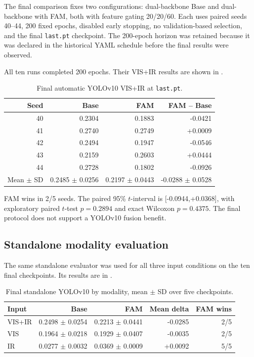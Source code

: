 The final comparison fixes two configurations: dual-backbone Base and
dual-backbone with FAM, both with feature gating 20/20/60. Each uses paired
seeds 40--44, 200 fixed epochs, disabled early stopping, no validation-based selection,
and the final \texttt{last.pt} checkpoint. The 200-epoch horizon was retained
because it was declared in the historical YAML schedule before the final results were observed.

All ten runs completed 200 epochs. Their VIS+IR results are shown in .

\begin{table}[htbp]
  \centering
  \caption{Final automatic YOLOv10 VIS+IR \mapfifty{} at \texttt{last.pt}.}
  \label{tab:yolo-raw}
  \begin{tabular}{rrrr}
    \toprule
    Seed & Base & FAM & FAM -- Base \\
    \midrule
    40 & 0.2304 & 0.1883 & -0.0421 \\
    41 & 0.2740 & 0.2749 & +0.0009 \\
    42 & 0.2494 & 0.1947 & -0.0546 \\
    43 & 0.2159 & 0.2603 & +0.0444 \\
    44 & 0.2728 & 0.1802 & -0.0926 \\
    \midrule
    Mean \(\pm\) SD & 0.2485 \(\pm\) 0.0256 & 0.2197 \(\pm\) 0.0443 & -0.0288 \(\pm\) 0.0528 \\
    \bottomrule
  \end{tabular}
\end{table}

FAM wins in 2/5 seeds. The paired 95\% \(t\)-interval is
[-0.0944,+0.0368], with exploratory paired \(t\)-test \(p=0.2894\) and exact
Wilcoxon \(p=0.4375\). The final protocol does not support a YOLOv10 fusion
benefit.

\subsection{Standalone modality evaluation}

The same standalone evaluator was used for all three input conditions on the
ten final checkpoints. Its results are in .

\begin{table}[H]
  \centering
  \caption{Final standalone YOLOv10 \mapfifty{} by modality, mean \(\pm\) SD
  over five checkpoints.}
  \label{tab:yolo-modalities}
  \begin{tabular}{lrrrr}
    \toprule
    Input & Base & FAM & Mean delta & FAM wins \\
    \midrule
    VIS+IR & 0.2498 \(\pm\) 0.0254 & 0.2213 \(\pm\) 0.0441 & -0.0285 & 2/5 \\
    VIS & 0.1964 \(\pm\) 0.0218 & 0.1929 \(\pm\) 0.0407 & -0.0035 & 2/5 \\
    IR & 0.0277 \(\pm\) 0.0032 & 0.0369 \(\pm\) 0.0009 & +0.0092 & 5/5 \\
    \bottomrule
  \end{tabular}
\end{table}

